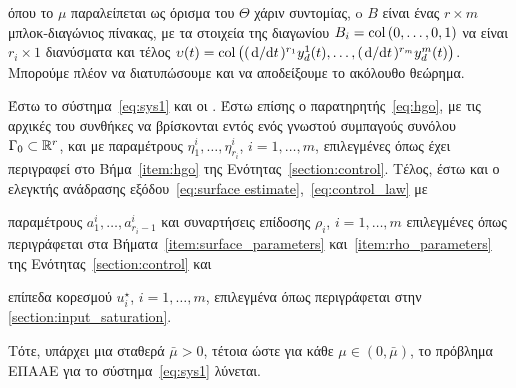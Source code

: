 όπου το $\mu$ παραλείπεται ως όρισμα του $\Theta$ χάριν συντομίας, o $B$ είναι ένας $r\times m$ μπλοκ-διαγώνιος πίνακας, με τα στοιχεία της διαγωνίου $B_i = \col\pqty{0,\ldots,0,1}$ να είναι $r_i \times 1$ διανύσματα και τέλος $\upsilon(t) = \col\pqty{(\dv*{t})^{r_1} y_d^1(t), \ldots, (\dv*{t})^{r_m} y_d^m(t)}$. Μπορούμε πλέον να διατυπώσουμε και να αποδείξουμε το ακόλουθο θεώρημα.

\begin{theorem}
    \label{theorem_of}
    Έστω το σύστημα~\eqref{eq:sys1} και οι . Έστω επίσης ο παρατηρητής~\eqref{eq:hgo}, με τις αρχικές του συνθήκες να βρίσκονται εντός ενός γνωστού συμπαγούς συνόλου $\Gamma_0 \subset \mathbb{R}^{r}$, και με παραμέτρους $\eta_1^i, \ldots, \eta_{r_i}^i$, $i = 1,\ldots, m$, επιλεγμένες όπως έχει περιγραφεί στο Βήμα~\ref{item:hgo} της Ενότητας~\ref{section:control}. Τέλος, έστω και ο ελεγκτής ανάδρασης εξόδου~\eqref{eq:surface estimate},~\eqref{eq:control_law} με 
    \begin{enumerate*}[label=(\alph*)]
        \item παραμέτρους $a_1^i, \ldots, a_{r_i-1}^i$ και συναρτήσεις επίδοσης $\rho_i$, $i = 1,\ldots, m$ επιλεγμένες όπως περιγράφεται στα Βήματα~\ref{item:surface_parameters} και~\ref{item:rho_parameters} της Ενότητας~\ref{section:control} και
        \item επίπεδα κορεσμού $u_i^\star$, $i = 1,\ldots, m$, επιλεγμένα όπως περιγράφεται στην  \cref{section:input_saturation}.
    \end{enumerate*}
    Τότε, υπάρχει μια σταθερά $\bar \mu > 0$, τέτοια ώστε για κάθε $\mu \in (0, \bar \mu)$, το πρόβλημα ΕΠΑΑΕ για το σύστημα~\eqref{eq:sys1} λύνεται.
\end{theorem}


